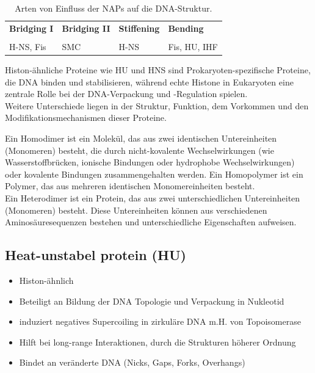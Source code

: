 \begin{table}[H]
    \centering
    \begin{tabular}{p{3cm}p{3cm}p{3cm}p{3cm}}
        \textbf{Bridging I}  & \textbf{Bridging II} & \textbf{Stiffening} & \textbf{Bending} \\ \\
        H-NS, Fis & SMC & H-NS & Fis, HU, IHF 
    \end{tabular}
    \caption{Arten von Einfluss der NAPs auf die DNA-Struktur.}
    \label{tab:napeinfluss}
\end{table}    

\begin{mybox}[title=Was unterscheidet Histon-ähnliche Proteine von tatsächlichen Histonen? ]
 Histon-ähnliche Proteine wie HU und HNS sind Prokaryoten-spezifische Proteine, die DNA binden und stabilisieren, während echte Histone in Eukaryoten eine zentrale Rolle bei der DNA-Verpackung und -Regulation spielen.  \\ Weitere Unterschiede liegen in der Struktur, Funktion, dem Vorkommen und den Modifikationsmechanismen dieser Proteine.
\end{mybox}
\begin{mybox}[title=Homo- und Heterodimere und -polymere]
Ein Homodimer ist ein Molekül, das aus zwei identischen Untereinheiten (Monomeren) besteht, die durch nicht-kovalente Wechselwirkungen (wie Wasserstoffbrücken, ionische Bindungen oder hydrophobe Wechselwirkungen) oder kovalente Bindungen zusammengehalten werden. Ein Homopolymer ist ein Polymer, das aus mehreren identischen Monomereinheiten besteht.  \\
 Ein Heterodimer ist ein Protein, das aus zwei unterschiedlichen Untereinheiten (Monomeren) besteht. Diese Untereinheiten können aus verschiedenen Aminosäuresequenzen bestehen und unterschiedliche Eigenschaften aufweisen.   
\end{mybox} 
\subsection{Heat-unstabel protein (HU)} 
 \begin{itemize}
 \item Histon-ähnlich
     \item Beteiligt an Bildung der DNA Topologie und Verpackung in Nukleotid
     \item induziert negatives Supercoiling in zirkuläre DNA m.H. von Topoisomerase
     \item Hilft bei long-range Interaktionen, durch die Strukturen höherer Ordnung
     \item Bindet an veränderte DNA (Nicks, Gaps, Forks, Overhangs)
 \end{itemize}
 
